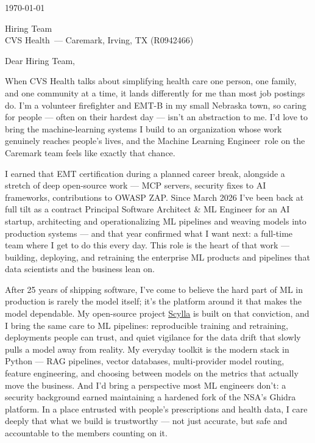 \documentclass{resume}
\def\company{CVS Health}
\def\role{Machine Learning Engineer}
\def\manager{Hiring Team}
\begin{document}
\vspace{0.5em}
\today

\bigskip
\noindent \manager \\
\company\ --- Caremark, Irving, TX (R0942466)

\bigskip
\noindent Dear \manager,

When CVS Health talks about simplifying health care one person, one family, and one community at a time, it lands differently for me than most job postings do. I'm a volunteer firefighter and EMT-B in my small Nebraska town, so caring for people --- often on their hardest day --- isn't an abstraction to me. I'd love to bring the machine-learning systems I build to an organization whose work genuinely reaches people's lives, and the \role\ role on the Caremark team feels like exactly that chance.

I earned that EMT certification during a planned career break, alongside a stretch of deep open-source work --- MCP servers, security fixes to AI frameworks, contributions to OWASP ZAP. Since March 2026 I've been back at full tilt as a contract Principal Software Architect \& ML Engineer for an AI startup, architecting and operationalizing ML pipelines and weaving models into production systems --- and that year confirmed what I want next: a full-time team where I get to do this every day. This role is the heart of that work --- building, deploying, and retraining the enterprise ML products and pipelines that data scientists and the business lean on.

After 25 years of shipping software, I've come to believe the hard part of ML in production is rarely the model itself; it's the platform around it that makes the model dependable. My open-source project \href{https://github.com/CryptoJones/Scylla}{Scylla} is built on that conviction, and I bring the same care to ML pipelines: reproducible training and retraining, deployments people can trust, and quiet vigilance for the data drift that slowly pulls a model away from reality. My everyday toolkit is the modern stack in Python --- RAG pipelines, vector databases, multi-provider model routing, feature engineering, and choosing between models on the metrics that actually move the business. And I'd bring a perspective most ML engineers don't: a security background earned maintaining a hardened fork of the NSA's Ghidra platform. In a place entrusted with people's prescriptions and health data, I care deeply that what we build is trustworthy --- not just accurate, but safe and accountable to the members counting on it.
\end{document}
